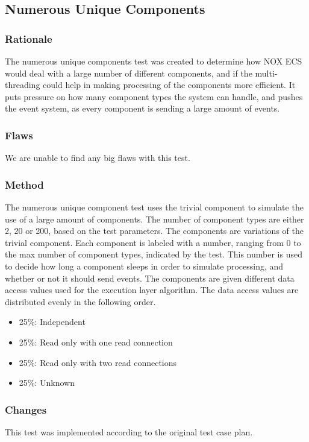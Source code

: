\subsection{Numerous Unique Components}
\subsubsection{Rationale}
The numerous unique components test was created to determine how NOX ECS would deal with a large number of different components,
and if the multi-threading could help in making processing of the components more efficient.
It puts pressure on how many component types the system can handle, and pushes the event system, as every component is sending a large amount of events.

\subsubsection{Flaws}
We are unable to find any big flaws with this test.

\subsubsection{Method}
The numerous unique component test uses the trivial component to simulate the use of a large amount of components.
The number of component types are either 2, 20 or 200, based on the test parameters. The components are variations of the trivial component.
Each component is labeled with a number, ranging from 0 to the max number of component types, indicated by the test.
This number is used to decide how long a component sleeps in order to simulate processing, and whether or not it should send events.
The components are given different data access values used for the execution layer algorithm.
The data access values are distributed evenly in the following order.
\begin{itemize}
    \item 25\%: Independent
    \item 25\%: Read only with one read connection
    \item 25\%: Read only with two read connections
    \item 25\%: Unknown
\end{itemize}

\subsubsection{Changes}
This test was implemented according to the original test case plan.

